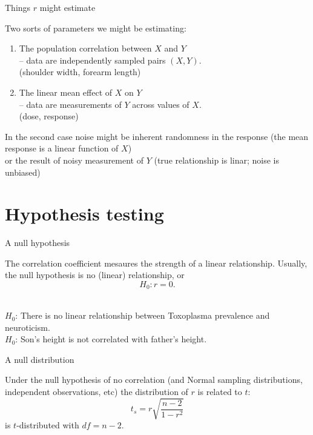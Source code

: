 \begin{frame}{Things $r$ might estimate}

  Two sorts of parameters we might be estimating:
  \begin{enumerate}
    \item The population correlation between $X$ and $Y$ \\
      -- data are independently sampled pairs $(X,Y)$. \\
       (shoulder width, forearm length)
    \item The linear mean effect of $X$ on $Y$ \\
      -- data are measurements of $Y$ across values of $X$. \\
       (dose, response) 
  \end{enumerate}

    \vspace{2em}

    In the second case noise might be inherent randomness in the response
    (the \alert{mean response} is a linear function of $X$) \\
    or the result of noisy measurement of $Y$ (true relationship is linar; noise is unbiased)

\end{frame}

\section{Hypothesis testing}

\begin{frame}{A null hypothesis}

  The correlation coefficient mesaures the strength of a linear relationship.
  Usually, the null hypothesis is \alert{no (linear) relationship}, or
  \[ H_0 : r=0 . \]


    \vspace{2em}

    \\
    $H_0$: There is no linear relationship between Toxoplasma prevalence and neuroticism.\\
    $H_0$: Son's height is not correlated with father's height.

\end{frame}

\begin{frame}{A null distribution}

  Under the null hypothesis of no correlation 
  {\small (and Normal sampling distributions, independent observations, etc)}
  the distribution of $r$ is related to $t$:
  \[
    t_s = r \sqrt{\frac{n-2}{1-r^2}}
  \]
  is $t$-distributed with $df=n-2$.



\end{frame}

